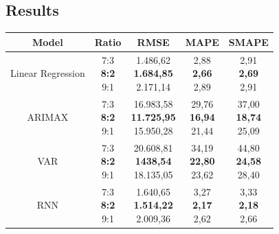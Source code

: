 \documentclass{ieeeojies}
\begin{document}
\subsection {Results}
\begin{table}[H]
    \begin{tabular*}{\linewidth}{@{\extracolsep{\fill}}|c|c|c|c|c|}
        \hline
        \textbf{Model} & \textbf{Ratio} & \textbf{RMSE} & \textbf{MAPE} & \textbf{SMAPE} \\
        \hline
        Linear Regression & \makecell{7:3 \\ \textbf{8:2} \\ 9:1} & \makecell{1.486,62 \\ \textbf{1.684,85} \\ 2.171,14} & \makecell{2,88 \\ \textbf{2,66} \\ 2,89} & \makecell{2,91 \\ \textbf{2,69} \\ 2,91} \\
        \hline
        ARIMAX & \makecell{7:3 \\ \textbf{8:2} \\ 9:1} & \makecell{16.983,58 \\ \textbf{11.725,95} \\ 15.950,28} & \makecell{29,76 \\ \textbf{16,94} \\ 21,44} & \makecell{37,00 \\ \textbf{18,74} \\ 25,09} \\
        \hline
        VAR & \makecell{7:3 \\ \textbf{8:2} \\ 9:1} & \makecell{20.608,81 \\ \textbf{1438,54} \\ 18.135,05} & \makecell{34,19 \\ \textbf{22,80} \\ 23,62} & \makecell{44,80 \\ \textbf{24,58} \\ 28,40} \\
        \hline
        RNN & \makecell{7:3 \\ \textbf{8:2} \\ 9:1} & \makecell{1.640,65 \\ \textbf{1.514,22} \\ 2.009,36} & \makecell{3,27 \\ \textbf{2,17} \\ 2,62} & \makecell{3,33 \\ \textbf{2,18} \\ 2,66} \\

\end{tabular*}
\end{table}
\end{document}
